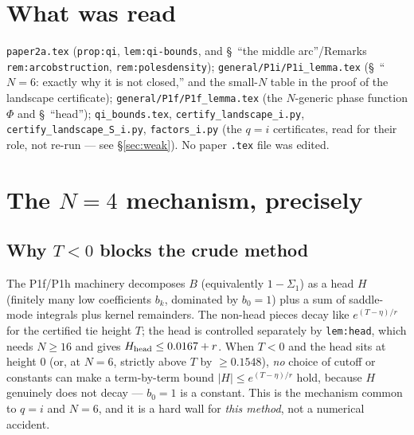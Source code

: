 \documentclass[11pt]{article}
\theoremstyle{plain}
\theoremstyle{remark}
\begin{document}
\section{What was read}
\texttt{paper2a.tex} (\texttt{prop:qi}, \texttt{lem:qi-bounds}, and \S~``the middle arc''/Remarks
\texttt{rem:arcobstruction}, \texttt{rem:polesdensity}); \texttt{general/P1i/P1i\_lemma.tex}
(\S~``$N=6$: exactly why it is not closed,'' and the small-$N$ table in the proof of the landscape
certificate); \texttt{general/P1f/P1f\_lemma.tex} (the $N$-generic phase function $\Phi$ and \S~``head'');
\texttt{qi\_bounds.tex}, \texttt{certify\_landscape\_i.py}, \texttt{certify\_landscape\_S\_i.py},
\texttt{factors\_i.py} (the $q=i$ certificates, read for their role, not re-run --- see
\S\ref{sec:weak}). No paper \texttt{.tex} file was edited.

\section{The $N=4$ mechanism, precisely}

\subsection{Why $T<0$ blocks the crude method}
The P1f/P1h machinery decomposes $B$ (equivalently $1-\Sigma_1$) as a head $H$ (finitely many low
coefficients $b_k$, dominated by $b_0=1$) plus a sum of saddle-mode integrals plus kernel remainders. The
non-head pieces decay like $e^{(T-\eta)/r}$ for the certified tie height $T$; the head is controlled
separately by \texttt{lem:head}, which needs $N\ge16$ and gives $H_{\rm head}\le0.0167+r$. When $T<0$ and
the head sits at height $0$ (or, at $N=6$, strictly above $T$ by $\ge0.1548$), \emph{no} choice of cutoff
or constants can make a term-by-term bound $|H|\le e^{(T-\eta)/r}$ hold, because $H$ genuinely does not
decay --- $b_0=1$ is a constant. This is the mechanism common to $q=i$ and $N=6$, and it is a hard wall
for \emph{this method}, not a numerical accident.
\end{document}
